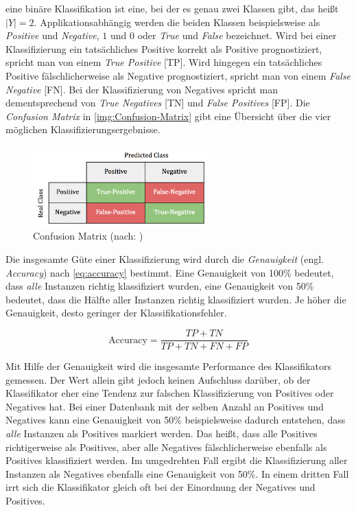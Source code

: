 eine binäre Klassifikation ist eine, bei der es genau zwei Klassen gibt, das heißt $|Y| = 2$. Applikationsabhängig werden die beiden Klassen beispielsweise als \emph{Positive} und \emph{Negative}, $1$ und $0$ oder \emph{True} und \emph{False} bezeichnet. Wird bei einer Klassifizierung ein tatsächliches Positive korrekt als Positive prognostiziert, spricht man von einem \emph{True Positive} [TP]. Wird hingegen ein tatsächliches Positive fälschlicherweise als Negative prognostiziert, spricht man von einem \emph{False Negative} [FN]. Bei der Klassifizierung von Negatives spricht man dementsprechend von \emph{True Negatives} [TN] und \emph{False Positives} [FP]. Die \emph{Confusion Matrix} in \autoref{img:Confusion-Matrix} gibt eine Übersicht über die vier möglichen Klassifizierungsergebnisse. \cite[S. 213 - 214]{machine_kubat}

\begin{figure}[h]
	\centering
	\includegraphics[width=0.6\textwidth]{bilder/Confusion-Matrix02.png}
	\caption[Confusion Matrix]{Confusion Matrix (nach: \cite[S. 214]{machine_kubat})}
	\label{img:Confusion-Matrix}
\end{figure}

Die insgesamte Güte einer Klassifizierung wird durch die \emph{Genauigkeit} (engl. \emph{Accuracy}) nach \autoref{eq:accuracy} bestimmt. Eine Genauigkeit von 100\% bedeutet, dass \emph{alle} Instanzen richtig klassifiziert wurden, eine Genauigkeit von 50\% bedeutet, dass die Hälfte aller Instanzen richtig klassifiziert wurden. Je höher die Genauigkeit, desto geringer der Klassifikationsfehler. \cite[S. 214]{machine_kubat}

\begin{equation}
\text{Accuracy} = \frac{TP+TN}{TP+TN+FN+FP}
\label{eq:accuracy}
\end{equation}

Mit Hilfe der Genauigkeit wird die insgesamte Performance des Klassifikators gemessen. Der Wert allein gibt jedoch keinen Aufschluss darüber, ob der Klassifikator eher eine Tendenz zur falschen Klassifizierung von Positives oder Negatives hat. Bei einer Datenbank mit der selben Anzahl an Positives und Negatives kann eine Genauigkeit von 50\% beispielsweise dadurch entstehen, dass \emph{alle} Instanzen als Positives markiert werden. Das heißt, dass alle Positives richtigerweise als Positives, aber alle Negatives fälschlicherweise ebenfalls als Positives klassifiziert werden. Im umgedrehten Fall ergibt die Klassifizierung aller Instanzen als Negatives ebenfalls eine Genauigkeit von 50\%. In einem dritten Fall irrt sich die Klassifikator gleich oft bei der Einordnung der Negatives und Positives. 


